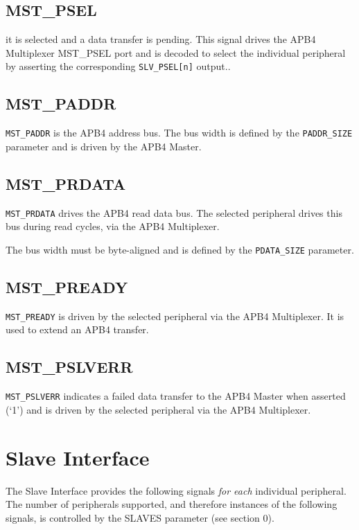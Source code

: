 \subsection{MST\_PSEL}\label{mst_psel}


it is selected and a data transfer is pending. This signal drives the
APB4 Multiplexer MST\_PSEL port and is decoded to select the individual
peripheral by asserting the corresponding \texttt{SLV\_PSEL[n]} output..

\subsection{MST\_PADDR}\label{mst_paddr}

\texttt{MST\_PADDR} is the APB4 address bus. The bus width is defined by the
\texttt{PADDR\_SIZE} parameter and is driven by the APB4 Master.

\subsection{MST\_PRDATA}\label{mst_prdata}

\texttt{MST\_PRDATA} drives the APB4 read data bus. The selected peripheral
drives this bus during read cycles, via the APB4 Multiplexer.

The bus width must be byte-aligned and is defined by the \texttt{PDATA\_SIZE}
parameter.

\subsection{MST\_PREADY}\label{mst_pready}

\texttt{MST\_PREADY} is driven by the selected peripheral via the APB4
Multiplexer. It is used to extend an APB4 transfer.

\subsection{MST\_PSLVERR}\label{mst_pslverr}

\texttt{MST\_PSLVERR} indicates a failed data transfer to the APB4 Master when
asserted (`1') and is driven by the selected peripheral via the APB4
Multiplexer.

\section{Slave Interface}\label{slave-interface}

The Slave Interface provides the following signals \emph{for each}
individual peripheral. The number of peripherals supported, and
therefore instances of the following signals, is controlled by the
SLAVES parameter (see section 0).

